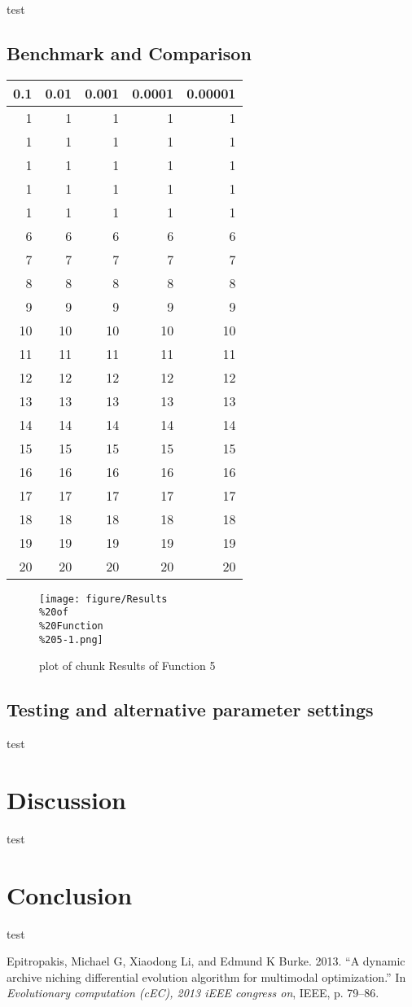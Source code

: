 \documentclass[12pt,a4paper]{article}
\begin{document}
test

\subsection{Benchmark and Comparison}\label{benchmark-and-comparison}

\begin{longtable}[c]{@{}rrrrr@{}}
\toprule
0.1 & 0.01 & 0.001 & 0.0001 & 0.00001\tabularnewline
\midrule
\endhead
1 & 1 & 1 & 1 & 1\tabularnewline
1 & 1 & 1 & 1 & 1\tabularnewline
1 & 1 & 1 & 1 & 1\tabularnewline
1 & 1 & 1 & 1 & 1\tabularnewline
1 & 1 & 1 & 1 & 1\tabularnewline
6 & 6 & 6 & 6 & 6\tabularnewline
7 & 7 & 7 & 7 & 7\tabularnewline
8 & 8 & 8 & 8 & 8\tabularnewline
9 & 9 & 9 & 9 & 9\tabularnewline
10 & 10 & 10 & 10 & 10\tabularnewline
11 & 11 & 11 & 11 & 11\tabularnewline
12 & 12 & 12 & 12 & 12\tabularnewline
13 & 13 & 13 & 13 & 13\tabularnewline
14 & 14 & 14 & 14 & 14\tabularnewline
15 & 15 & 15 & 15 & 15\tabularnewline
16 & 16 & 16 & 16 & 16\tabularnewline
17 & 17 & 17 & 17 & 17\tabularnewline
18 & 18 & 18 & 18 & 18\tabularnewline
19 & 19 & 19 & 19 & 19\tabularnewline
20 & 20 & 20 & 20 & 20\tabularnewline
\bottomrule
\end{longtable}

\begin{figure}[htbp]
\centering
\texttt{[image: figure/Results\\\%20of\\\%20Function\\\%205-1.png]}
\caption{plot of chunk Results of Function 5}
\end{figure}

\subsection{Testing and alternative parameter
settings}\label{testing-and-alternative-parameter-settings}

test

\section{Discussion}\label{discussion}

test

\section{Conclusion}\label{conclusion}

test \newpage

\hypertarget{refs}{}
\hypertarget{ref-epitropakisux5f2013}{}
Epitropakis, Michael G, Xiaodong Li, and Edmund K Burke. 2013. ``A
dynamic archive niching differential evolution algorithm for multimodal
optimization.'' In \emph{Evolutionary computation (cEC), 2013 iEEE
congress on}, IEEE, p. 79--86.
\end{document}
